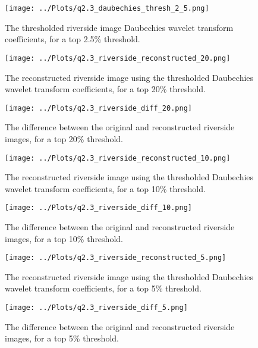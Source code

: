 \documentclass[12pt]{report} %
\begin{document}
\begin{figure}[htbp]
    \centering
    \texttt{[image: ../Plots/q2.3\_daubechies\_thresh\_2\_5.png]}
    \caption{The thresholded riverside image Daubechies wavelet transform coefficients, for a top 2.5\% threshold.}
    \label{fig:thresholded_image2.5}
\end{figure}

\begin{figure}[htbp]
    \centering
    \texttt{[image: ../Plots/q2.3\_riverside\_reconstructed\_20.png]}
    \caption{The reconstructed riverside image using the thresholded Daubechies wavelet transform coefficients, for a top 20\% threshold.}
    \label{fig:reconstructed_image20}
\end{figure}

\begin{figure}[htbp]
    \centering
    \texttt{[image: ../Plots/q2.3\_riverside\_diff\_20.png]}
    \caption{The difference between the original and reconstructed riverside images, for a top 20\% threshold.}
    \label{fig:diff_image20}
\end{figure}

\begin{figure}[htbp]
    \centering
    \texttt{[image: ../Plots/q2.3\_riverside\_reconstructed\_10.png]}
    \caption{The reconstructed riverside image using the thresholded Daubechies wavelet transform coefficients, for a top 10\% threshold.}
    \label{fig:reconstructed_image10}
\end{figure}

\begin{figure}[htbp]
    \centering
    \texttt{[image: ../Plots/q2.3\_riverside\_diff\_10.png]}
    \caption{The difference between the original and reconstructed riverside images, for a top 10\% threshold.}
    \label{fig:diff_image10}
\end{figure}


\begin{figure}[htbp]
    \centering
    \texttt{[image: ../Plots/q2.3\_riverside\_reconstructed\_5.png]}
    \caption{The reconstructed riverside image using the thresholded Daubechies wavelet transform coefficients, for a top 5\% threshold.}
    \label{fig:reconstructed_image5}
\end{figure}

\begin{figure}[htbp]
    \centering
    \texttt{[image: ../Plots/q2.3\_riverside\_diff\_5.png]}
    \caption{The difference between the original and reconstructed riverside images, for a top 5\% threshold.}
    \label{fig:diff_image5}
\end{figure}
\end{document}
